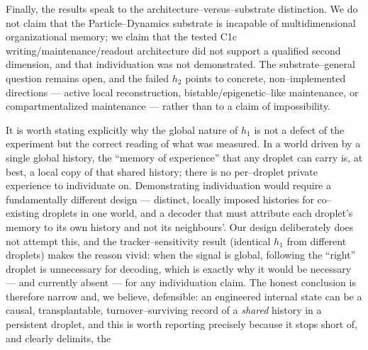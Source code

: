 \documentclass[11pt]{article}
\begin{document}
Finally, the results speak to the architecture--versus--substrate distinction. We do not claim that the
Particle--Dynamics substrate is incapable of multidimensional organizational memory; we claim that the tested C1c
writing/maintenance/readout architecture did not support a qualified second dimension, and that individuation was
not demonstrated. The substrate--general question remains open, and the failed $h_2$ points to concrete,
non--implemented directions --- active local reconstruction, bistable/epigenetic--like maintenance, or
compartmentalized maintenance --- rather than to a claim of impossibility.

It is worth stating explicitly why the global nature of $h_1$ is not a defect of the experiment but the correct
reading of what was measured. In a world driven by a single global history, the ``memory of experience'' that any
droplet can carry is, at best, a local copy of that shared history; there is no per--droplet private experience to
individuate on. Demonstrating individuation would require a fundamentally different design --- distinct, locally
imposed histories for co--existing droplets in one world, and a decoder that must attribute each droplet's memory to
its own history and not its neighbours'. Our design deliberately does not attempt this, and the tracker--sensitivity
result (identical $h_1$ from different droplets) makes the reason vivid: when the signal is global, following the
``right'' droplet is unnecessary for decoding, which is exactly why it would be necessary --- and currently absent
--- for any individuation claim. The honest conclusion is therefore narrow and, we believe, defensible: an
engineered internal state can be a causal, transplantable, turnover--surviving record of a \emph{shared} history in
a persistent droplet, and this is worth reporting precisely because it stops short of, and clearly delimits, the
\end{document}
